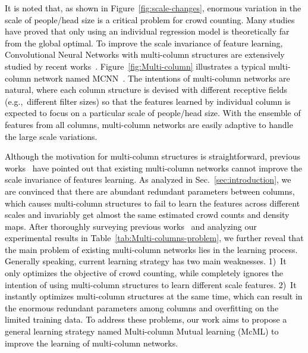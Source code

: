 \documentclass[sigconf]{acmart}
\newcommand{\ljx}[1]{\textcolor{black}{#1}}
\newcommand{\czq}[1]{\textcolor{black}{#1}}
\newcommand\Fig{Figure}
\newcommand\Sec{Sec.}
\newcommand\Tbl{Table}
\begin{document}
\czq{It is noted that, as shown in \Fig~\ref{fig:scale-changes}, enormous variation in the scale of people/head size is a critical problem for crowd counting.
Many studies~\cite{single-error-05,single-error-14,single-error-16,MM-2018,single-error-17,huang2018gnas} have proved that only using an individual regression model is theoretically far from the global optimal.
To improve the scale invariance of feature learning, Convolutional Neural Networks with multi-column structures are extensively studied by recent works~\cite{deep-multi-attention-AFP-18,deep-fscale-multi-task-17,deep-multi-pyramid-cnn-17,deep-multi-cnn-boosting-16,MCNN-16}.
\Fig~\ref{fig:Multi-column} illustrates a typical multi-column network named MCNN~\cite{MCNN-16}.
The intentions of multi-column networks are natural, where each column structure is devised with different receptive fields (e.g.,~different filter sizes) so that the features learned by individual column is expected to focus on a particular scale of people/head size.
With the ensemble of features from all columns, multi-column networks are easily adaptive to handle the large scale variations.}

\czq{Although the motivation for multi-column structures is straightforward, previous works~\cite{CSRNet-18,deep-training-ICCNN-18,deep-pooling-fscale-Defense-18} have pointed out that existing multi-column networks cannot improve the scale invariance of features learning.
As analyzed in \Sec~\ref{sec:introduction}, we are convinced that there are abundant redundant parameters between columns, which causes multi-column structures to fail to learn the features across different scales and invariably get almost the same estimated crowd counts and density maps.
After thoroughly surveying previous works~\cite{CSRNet-18,deep-training-ICCNN-18,deep-pooling-fscale-Defense-18,single-error-16,single-error-17} and analyzing our experimental results in \Tbl~\ref{tab:Multi-columns-problem}, we further reveal that the main problem of existing multi-column networks lies in the learning process.
Generally speaking, current learning strategy has two main weaknesses.
1)~It only optimizes the objective of crowd counting, while completely ignores the intention of using multi-column structures to learn different scale features.
2)~It instantly optimizes multi-column structures at the same time, which can result in the enormous redundant parameters among columns and overfitting on the limited training data.
To address these problems, our work aims to propose a general learning strategy \ljx{named} Multi-column Mutual learning (McML) to improve the learning of multi-column networks.}
\end{document}
